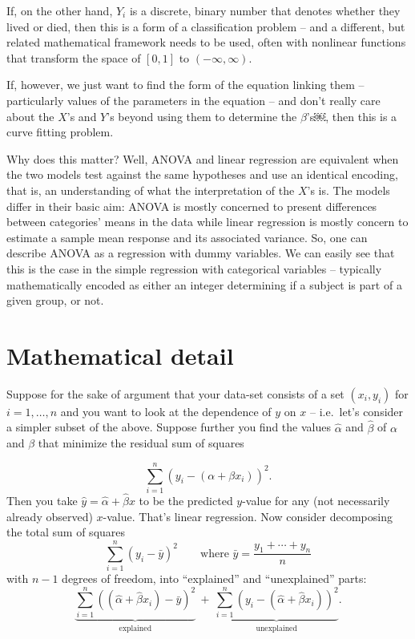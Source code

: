 \documentclass[]{book}
\begin{document}
If, on the other hand, \(Y_i\) is a discrete, binary number that denotes whether they lived or died, then this is a form of a classification problem -- and a different, but related mathematical framework needs to be used, often with nonlinear functions that transform the space of \([0,1]\) to \((-\infty,\infty)\).

If, however, we just want to find the form of the equation linking them -- particularly values of the parameters in the equation -- and don't really care about the \(X\)'s and \(Y\)'s beyond using them to determine the \(\beta\)'s￼, then this is a curve fitting problem.

Why does this matter? Well, ANOVA and linear regression are equivalent when the two models test against the same hypotheses and use an identical encoding, that is, an understanding of what the interpretation of the \(X\)'s is. The models differ in their basic aim: ANOVA is mostly concerned to present differences between categories' means in the data while linear regression is mostly concern to estimate a sample mean response and its associated variance. So, one can describe ANOVA as a regression with dummy variables. We can easily see that this is the case in the simple regression with categorical variables -- typically mathematically encoded as either an integer determining if a subject is part of a given group, or not.

\hypertarget{mathematical-detail}{%
\section{Mathematical detail}\label{mathematical-detail}}

Suppose for the sake of argument that your data-set consists of a set \((x_i,y_i)\) for \(i=1,\ldots,n\) and you want to look at the dependence of \(y\) on \(x\) -- i.e.~let's consider a simpler subset of the above. Suppose further you find the values \(\hat\alpha\) and \(\hat\beta\) of \(\alpha\) and \(\beta\) that minimize the residual sum of squares

\[
\sum_{i=1}^n (y_i - (\alpha+\beta x_i))^2.
\]
Then you take \(\hat y = \hat\alpha+ \hat\beta x\) to be the predicted \(y\)-value for any (not necessarily already observed) \(x\)-value. That's linear regression.
Now consider decomposing the total sum of squares
\[
\sum_{i=1}^n (y_i - \bar y)^2 \qquad\text{where }\bar y = \frac{y_1+\cdots+y_n}{n}
\]
with \(n-1\) degrees of freedom, into ``explained'' and ``unexplained'' parts:
\[
\underbrace{\sum_{i=1}^n ((\hat\alpha+\hat\beta x_i) - \bar y)^2}_{\text{explained}}\  +\  \underbrace{\sum_{i=1}^n (y_i - (\hat\alpha+\hat\beta x_i))^2}_{\text{unexplained}}.
\]
\end{document}

